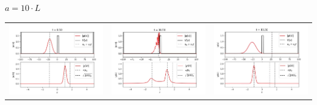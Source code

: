 \documentclass[11pt]{article}
\begin{document}
$a = 10\cdot L$ \\
\begin{tabular}{ccc}
	\includegraphics[scale=0.2]{sh_10_8_50} & 
	\includegraphics[scale=0.2]{sh_10_38_50} & 
	\includegraphics[scale=0.2]{sh_10_93_50} \\
\end{tabular}
\end{document}
